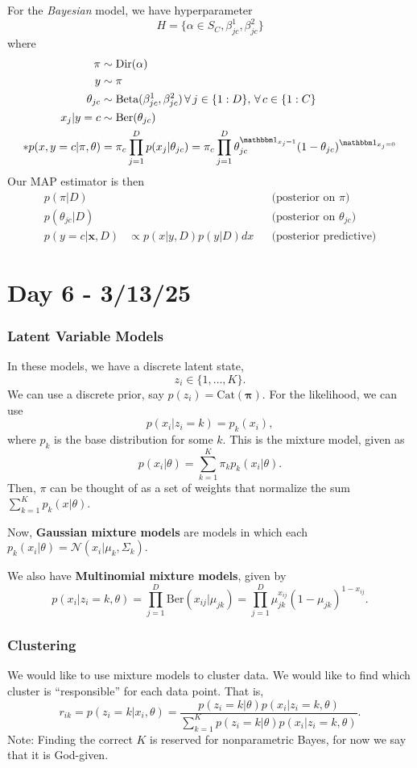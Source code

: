 \documentclass{chaistyle}
\begin{document}
For the \emph{Bayesian} model, we have hyperparameter \[H=\{\alpha\in S_C,\beta^1_{jc},\beta^2_{jc}\}\] where \begin{align*}
    \pi&\sim\text{Dir}(\alpha) \\
    y&\sim\pi \\ 
    \theta_{jc} &\sim \text{Beta}(\beta^1_{jc},\beta^2_{jc}) \,\fa j\in\{1:D\},\,\fa c\in\{1:C\} \\
    x_j|y=c&\sim \text{Ber}(\theta_{jc}) \\
    *p(x,y=c|\pi,\theta)&=\pi_c\prod_{j=1}^{D}p(x_j|\theta_{jc})=\pi_c\prod_{j=1}^{D} \theta_{jc}^{\indic_{x_j=1}} (1-\theta_{jc})^{\indic_{x_j=0}} \\
\end{align*}
Our MAP estimator is then \begin{align*}
    p(\pi|D)&   &&\text{(posterior on \(\pi\))} \\
    p(\theta_{jc}|D)&  &&\text{(posterior on \(\theta_{jc}\))} \\
    p(y=c|\mathbf{x},D)&\propto p(x|y,D)p(y|D) dx &&\text{(posterior predictive)}
\end{align*}
\section*{Day 6 - 3/13/25}
\subsubsection*{Latent Variable Models}
In these models, we have a discrete latent state, \[z_i\in \{1,\dots,K\}.\] We can use a discrete prior, say \(p(z_i)=\text{Cat}(\mathbf{\pi}).\) For the likelihood, we can use \[p(x_i|z_i=k)=p_k(x_i),\] where \(p_k\) is the base distribution for some \(k.\) This is the mixture model, given as \[p(x_i|\theta)=\sum_{k=1}^{K} \pi_kp_k(x_i|\theta).\] Then, \(\pi\) can be thought of as a set of weights that normalize the sum \(\sum_{k=1}^{K} p_k(x|\theta).\)

Now, \textbf{Gaussian mixture models} are models in which each \(p_k(x_i|\theta)=\mathcal{N}(x_i|\mu_k,\Sigma_k).\)

We also have \textbf{Multinomial mixture models}, given by \[p(x_i|z_i=k,\theta)=\prod_{j=1}^{D}\text{Ber}(x_{ij}|\mu_{jk})=\prod_{j=1}^{D}\mu_{jk}^{x_{ij}}(1-\mu_{jk})^{1-x_{ij}}.\]
\subsubsection*{Clustering}
We would like to use mixture models to cluster data. We would like to find which cluster is ``responsible'' for each data point. That is, \[r_{ik}=p(z_i=k|x_i,\theta)=\frac{p(z_i=k|\theta)p(x_i|z_i=k,\theta)}{\sum_{k=1}^{K} p(z_i=k|\theta)p(x_i|z_i=k,\theta)}.\] Note: Finding the correct \(K\) is reserved for nonparametric Bayes, for now we say that it is God-given.
\end{document}
